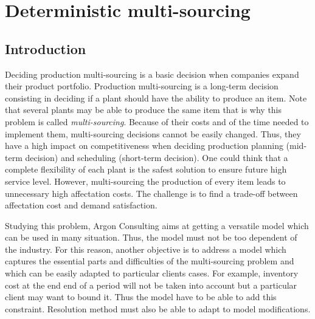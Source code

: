 \chapter{Deterministic multi-sourcing}
\label{chap:multi-sourcing:deterministic}

\section{Introduction}


Deciding production multi-sourcing is a basic decision when companies expand their product portfolio.
Production multi-sourcing is a long-term decision consisting in deciding if a plant should have the ability to produce an item.
Note that several plants may be able to produce the same item that is why this problem is called \emph{multi-sourcing}.
Because of their costs and of the time needed to implement them, multi-sourcing decisions cannot be easily changed.
Thus, they have a high impact on competitiveness when deciding production planning (mid-term decision) and scheduling (short-term decision).
One could think that a complete flexibility of each plant is the safest solution to ensure future high service level.
However, multi-sourcing the production of every item leads to unnecessary high affectation costs.
The challenge is to find a trade-off between affectation cost and demand satisfaction.


Studying this problem, Argon Consulting aims at getting a versatile model which can be used in many situation.
Thus, the model must not be too dependent of the industry.
For this reason, another objective is to address a model which captures the essential parts and difficulties of the multi-sourcing problem
and which can be easily adapted to particular clients cases.
For example, inventory cost at the end end of a period will not be taken into account but a particular client may want to bound it.
Thus the model have to be able to add this constraint.
Resolution method must also be able to adapt to model modifications.


